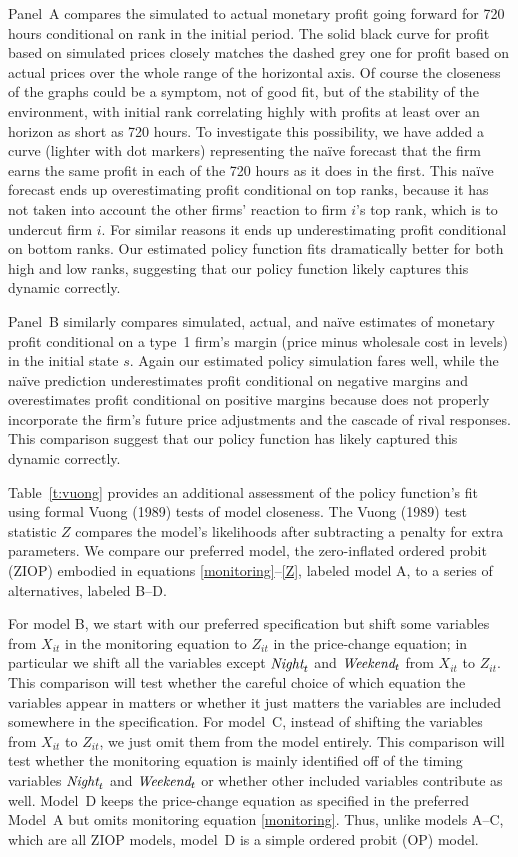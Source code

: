 \documentclass[11pt]{article}
\newcommand{\Night}{\mbox{\it Night}}
\newcommand{\Weekend}{\mbox{\it Weekend}}
\begin{document}
\begin{spacing}{1.3}
Panel~A compares the simulated to actual monetary profit going forward
for 720 hours conditional on rank in the initial period. The solid
black curve for profit based on simulated prices closely matches the
dashed grey one for profit based on actual prices over the whole range
of the horizontal axis. Of course the closeness of the graphs could be
a symptom, not of good fit, but of the stability of the environment,
with initial rank correlating highly with profits at least over an
horizon as short as 720 hours. To investigate this possibility, we
have added a curve (lighter with dot markers) representing the
na\"{i}ve forecast that the firm earns the same profit in each of the
720 hours as it does in the first. This na\"{i}ve forecast ends up
overestimating profit conditional on top ranks, because it has not
taken into account the other firms' reaction to firm $i$'s top rank,
which is to undercut firm $i$. For similar reasons it ends up
underestimating profit conditional on bottom ranks. Our estimated
policy function fits dramatically better for both high and low ranks,
suggesting that our policy function likely captures this dynamic
correctly.

Panel~B similarly compares simulated, actual, and na\"{i}ve estimates
of monetary profit conditional on a type~1 firm's margin (price minus
wholesale cost in levels) in the initial state $s$. Again our
estimated policy simulation fares well, while the na\"{i}ve prediction
underestimates profit conditional on negative margins and
overestimates profit conditional on positive margins because does not
properly incorporate the firm's future price adjustments and the
cascade of rival responses. This comparison suggest that our policy
function has likely captured this dynamic correctly.

Table~\ref{t:vuong} provides an additional assessment of the policy
function's fit using formal Vuong (1989) tests of model closeness. The
Vuong (1989) test statistic $Z$ compares the model's likelihoods after
subtracting a penalty for extra parameters. We compare our preferred
model, the zero-inflated ordered probit (ZIOP) embodied in equations
\eqref{monitoring}--\eqref{Z}, labeled model A, to a series of
alternatives, labeled B--D.

For model B, we start with our preferred specification but shift some
variables from $X_{it}$ in the monitoring equation to $Z_{it}$ in the
price-change equation; in particular we shift all the variables except
$\Night_t$ and $\Weekend_t$ from $X_{it}$ to $Z_{it}$. This comparison
will test whether the careful choice of which equation the variables
appear in matters or whether it just matters the variables are
included somewhere in the specification. For model~C, instead of
shifting the variables from $X_{it}$ to $Z_{it}$, we just omit them
from the model entirely. This comparison will test whether the
monitoring equation is mainly identified off of the timing variables
$\Night_t$ and $\Weekend_t$ or whether other included variables
contribute as well. Model~D keeps the price-change equation as
specified in the preferred Model~A but omits monitoring equation
\eqref{monitoring}. Thus, unlike models A--C, which are all ZIOP
models, model~D is a simple ordered probit (OP) model.


\end{spacing}
\end{document}
